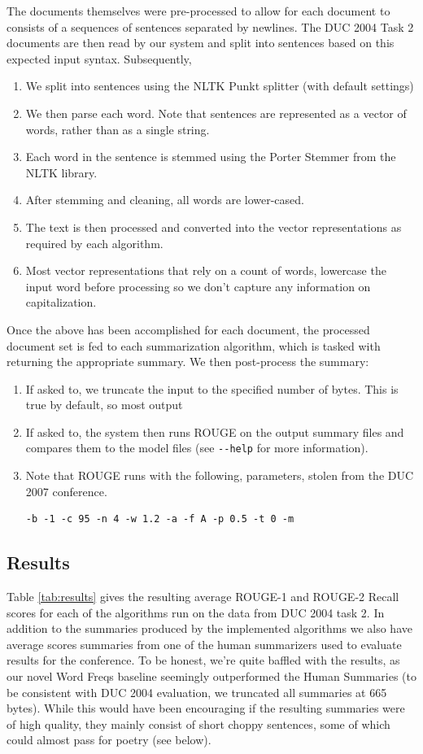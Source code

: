 \documentclass[11pt]{article}
\begin{document}
The documents themselves were pre-processed to allow for each document to consists of a sequences of sentences separated by newlines. The DUC 2004 Task 2 documents are then read by our system and split into sentences based on this expected input syntax. Subsequently,
\begin{enumerate}
\item We split into sentences using the NLTK Punkt splitter (with default settings)
\item We then parse each word. Note that sentences are represented as a vector of words, rather than as a single string.
\item Each word in the sentence is stemmed using the Porter Stemmer from the NLTK library.
\item After stemming and cleaning, all words are lower-cased.
\item The text is then processed and converted into the vector representations as required by each algorithm.
\item Most vector representations that rely on a count of words, lowercase the input word before processing so we don't capture any information on capitalization.
\end{enumerate}

Once the above has been accomplished for each document, the processed document set is fed to each summarization algorithm, which is tasked with returning the appropriate summary. We then post-process the summary:
\begin{enumerate}
\item If asked to, we truncate the input to the specified number of bytes. This is true by default, so most output
\item If asked to, the system then runs ROUGE on the output summary files and compares them to the model files (see \verb|--help| for more information).
\item Note that ROUGE runs with the following, parameters, stolen from the DUC 2007 conference.
\begin{verbatim}
-b -1 -c 95 -n 4 -w 1.2 -a -f A -p 0.5 -t 0 -m
\end{verbatim}
\end{enumerate}

\subsection{Results}
Table \ref{tab:results} gives the resulting average ROUGE-1 and ROUGE-2 Recall scores for each of the algorithms run on the data from DUC 2004 task 2. In addition to the summaries produced by the implemented algorithms we also have average scores summaries from one of the human summarizers used to evaluate results for the conference. To be honest, we're quite baffled with the results, as our novel Word Freqs baseline seemingly outperformed the Human Summaries (to be consistent with DUC 2004 evaluation, we truncated all summaries at 665 bytes). While this would have been encouraging if the resulting summaries were of high quality, they mainly consist of short choppy sentences, some of which could almost pass for poetry (see below).
\end{document}
